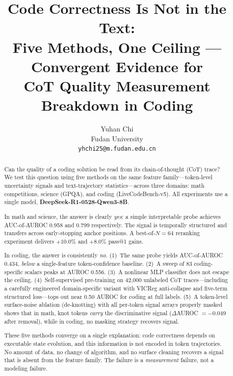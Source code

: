 \documentclass{article}
\title{Code Correctness Is Not in the Text:\\
Five Methods, One Ceiling --- Convergent Evidence for\\
CoT Quality Measurement Breakdown in Coding}
\author{Yuhan Chi\\Fudan University\\\texttt{yhchi25@m.fudan.edu.cn}}
\begin{document}
\maketitle

\begin{abstract}

Can the quality of a coding solution be read from its chain-of-thought (CoT) trace? We test this question using five methods on the same feature family—token-level uncertainty signals and text-trajectory statistics—across three domains: math competitions, science (GPQA), and coding (LiveCodeBench-v5). All experiments use a single model, \textbf{DeepSeek-R1-0528-Qwen3-8B}.

In math and science, the answer is clearly \emph{yes}: a simple interpretable probe achieves AUC-of-AUROC 0.958 and 0.799 respectively. The signal is temporally structured and transfers across early-stopping anchor positions. A best-of-$N=64$ reranking experiment delivers $+10.0\%$ and $+8.0\%$ pass@1 gains.

In coding, the answer is consistently \emph{no}. (1)~The same probe yields AUC-of-AUROC 0.434, \emph{below} a single-feature token-confidence baseline. (2)~A sweep of 83 coding-specific scalars peaks at AUROC 0.556. (3)~A nonlinear MLP classifier does not escape the ceiling. (4)~Self-supervised pre-training on 42{,}000 unlabeled CoT traces—including a carefully engineered domain-specific variant with VICReg anti-collapse and five-term structured loss—tops out near 0.50 AUROC for coding at full labels. (5)~A token-level surface-noise ablation (de-knotting) with all per-token signal arrays properly masked shows that in math, knot tokens \emph{carry} the discriminative signal ($\Delta$AUROC $= -0.049$ after removal), while in coding, no masking strategy recovers signal.

These five methods converge on a single explanation: code correctness depends on executable state evolution, and this information is not encoded in token trajectories. No amount of data, no change of algorithm, and no surface cleaning recovers a signal that is absent from the feature family. The failure is a \emph{measurement} failure, not a modeling failure.

\end{abstract}

\end{document}
